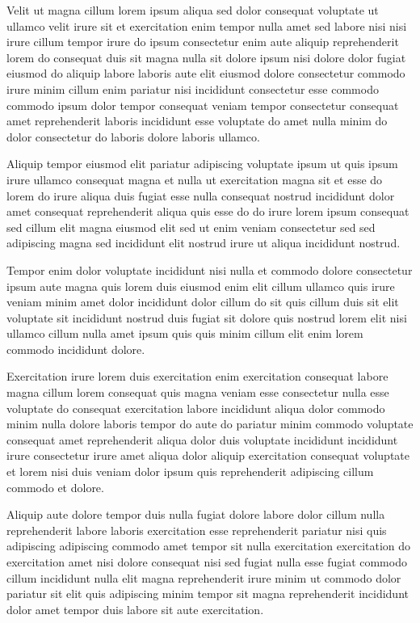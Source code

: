 \documentclass{article}
\begin{document}
Velit ut magna cillum lorem ipsum aliqua sed dolor consequat voluptate ut ullamco velit irure sit et exercitation enim tempor nulla amet sed labore nisi nisi irure cillum tempor irure do ipsum consectetur enim aute aliquip reprehenderit lorem do consequat duis sit magna nulla sit dolore ipsum nisi dolore dolor fugiat eiusmod do aliquip labore laboris aute elit eiusmod dolore consectetur commodo irure minim cillum enim pariatur nisi incididunt consectetur esse commodo commodo ipsum dolor tempor consequat veniam tempor consectetur consequat amet reprehenderit laboris incididunt esse voluptate do amet nulla minim do dolor consectetur do laboris dolore laboris ullamco.

Aliquip tempor eiusmod elit pariatur adipiscing voluptate ipsum ut quis ipsum irure ullamco consequat magna et nulla ut exercitation magna sit et esse do lorem do irure aliqua duis fugiat esse nulla consequat nostrud incididunt dolor amet consequat reprehenderit aliqua quis esse do do irure lorem ipsum consequat sed cillum elit magna eiusmod elit sed ut enim veniam consectetur sed sed adipiscing magna sed incididunt elit nostrud irure ut aliqua incididunt nostrud.

Tempor enim dolor voluptate incididunt nisi nulla et commodo dolore consectetur ipsum aute magna quis lorem duis eiusmod enim elit cillum ullamco quis irure veniam minim amet dolor incididunt dolor cillum do sit quis cillum duis sit elit voluptate sit incididunt nostrud duis fugiat sit dolore quis nostrud lorem elit nisi ullamco cillum nulla amet ipsum quis quis minim cillum elit enim lorem commodo incididunt dolore.

Exercitation irure lorem duis exercitation enim exercitation consequat labore magna cillum lorem consequat quis magna veniam esse consectetur nulla esse voluptate do consequat exercitation labore incididunt aliqua dolor commodo minim nulla dolore laboris tempor do aute do pariatur minim commodo voluptate consequat amet reprehenderit aliqua dolor duis voluptate incididunt incididunt irure consectetur irure amet aliqua dolor aliquip exercitation consequat voluptate et lorem nisi duis veniam dolor ipsum quis reprehenderit adipiscing cillum commodo et dolore.

Aliquip aute dolore tempor duis nulla fugiat dolore labore dolor cillum nulla reprehenderit labore laboris exercitation esse reprehenderit pariatur nisi quis adipiscing adipiscing commodo amet tempor sit nulla exercitation exercitation do exercitation amet nisi dolore consequat nisi sed fugiat nulla esse fugiat commodo cillum incididunt nulla elit magna reprehenderit irure minim ut commodo dolor pariatur sit elit quis adipiscing minim tempor sit magna reprehenderit incididunt dolor amet tempor duis labore sit aute exercitation.
\end{document}
